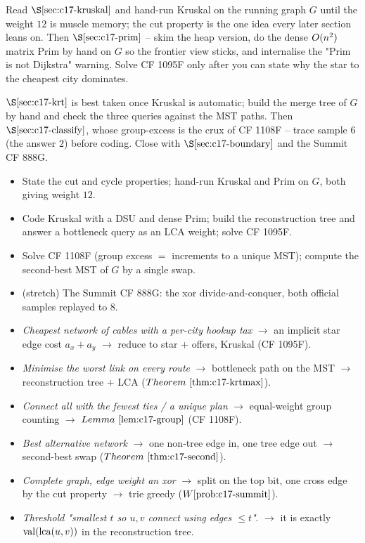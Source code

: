 
Read \(\secref{c17-kruskal}\) and hand-run Kruskal on the running graph \(G\)
until the weight \(12\) is muscle memory; the cut property is the one idea every
later section leans on.  Then \(\secref{c17-prim}\) -- skim the heap version, do
the dense \(O(n^2)\) matrix Prim by hand on \(G\) so the frontier view sticks,
and internalise the "Prim is not Dijkstra" warning.  Solve CF 1095F only after you
can state why the star to the cheapest city dominates.

\(\secref{c17-krt}\) is best taken once Kruskal is automatic; build the merge tree
of \(G\) by hand and check the three queries against the MST paths.  Then
\(\secref{c17-classify}\), whose group-excess is the crux of CF 1108F -- trace
sample 6 (the answer \(2\)) before coding.  Close with \(\secref{c17-boundary}\)
and the Summit CF 888G.


\begin{itemize}[nosep]
  \item {} State the cut and cycle properties; hand-run Kruskal and Prim on
        \(G\), both giving weight \(12\).
  \item {} Code Kruskal with a DSU and dense Prim; build the reconstruction
        tree and answer a bottleneck query as an LCA weight; solve CF 1095F.
  \item {} Solve CF 1108F (group excess \(=\) increments to a unique MST);
        compute the second-best MST of \(G\) by a single swap.
  \item {} (stretch) The Summit CF 888G: the xor divide-and-conquer, both
        official samples replayed to \(8\).
\end{itemize}


\begin{itemize}[nosep]
  \item \emph{Cheapest network of cables with a per-city hookup tax} \(\to\) an
        implicit star edge cost \(a_x+a_y\) \(\to\) reduce to star + offers,
        Kruskal (CF 1095F).
  \item \emph{Minimise the worst link on every route} \(\to\) bottleneck path on
        the MST \(\to\) reconstruction tree + LCA (\(\thmref{c17-krtmax}\)).
  \item \emph{Connect all with the fewest ties / a unique plan} \(\to\)
        equal-weight group counting \(\to\) \(\lemref{c17-group}\) (CF 1108F).
  \item \emph{Best alternative network} \(\to\) one non-tree edge in, one tree edge
        out \(\to\) second-best swap (\(\thmref{c17-second}\)).
  \item \emph{Complete graph, edge weight an xor} \(\to\) split on the top bit, one
        cross edge by the cut property \(\to\) trie greedy (\(\probref{c17-summit}\)).
  \item \emph{Threshold "smallest \(t\) so \(u,v\) connect using edges \(\le t\)"}.
        \(\to\) it is exactly \(\mathrm{val}(\operatorname{lca}(u,v))\) in the reconstruction tree.
\end{itemize}

